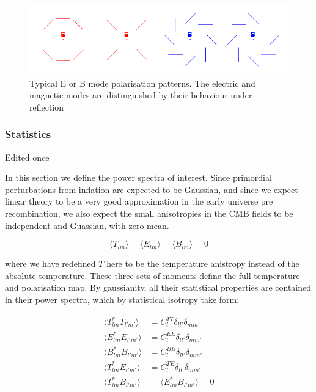 \documentclass[a4paper,10pt]{article}
\begin{document}
\begin{figure}[h]
  \includegraphics[width=\linewidth]{EBpicture.png}
  \caption{Typical E or B mode polarisation patterns. The electric and magnetic modes are distinguished by their behaviour under reflection}
\end{figure}

\subsubsection{Statistics}
Edited once



In this section we define the power spectra of interest. Since primordial perturbations from inflation are expected to be Gaussian, and since we expect linear theory to be a very good approximation in the early universe pre recombination, we also expect the small anisotropies in the CMB fields to be independent and Guassian, with zero mean. 

\begin{equation}
\langle T_{lm} \rangle = \langle E_{lm} \rangle = \langle B_{lm} \rangle = 0
\end{equation}

where we have redefined $T$ here to be the temperature anistropy instead of the absolute temperature. These three sets of moments define the full temperature and polarisation map. By gaussianity, all their statistical properties are contained in their power spectra, which by statistical isotropy take form:


\begin{equation}\begin{split}
\langle T_{lm}^*T_{l'm'} \rangle &= C^{TT}_l\delta_{ll'}\delta_{mm'}\\
\langle E_{lm}^*E_{l'm'} \rangle &= C^{EE}_l\delta_{ll'}\delta_{mm'}\\
\langle B_{lm}^*B_{l'm'} \rangle &= C^{BB}_l\delta_{ll'}\delta_{mm'}\\
\langle T_{lm}^*E_{l'm'} \rangle &= C^{TE}_l\delta_{ll'}\delta_{mm'}\\
\langle T_{lm}^*B_{l'm'} \rangle &= \langle E_{lm}^*B_{l'm'} \rangle = 0
\end{split}\end{equation}
\end{document}
